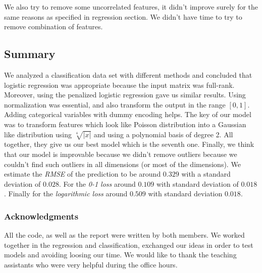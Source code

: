 \documentclass{article} %
\begin{document}
We also try to remove some uncorrelated features, it didn't improve surely for the same reasons as specified in regression section. We didn't have time to try to remove combination of features.

\subsection{Summary}

We analyzed a classification data set with different methods and concluded that logistic regression was appropriate because the input matrix was full-rank. Moreover, using the penalized logistic regression gave us similar results. Using normalization was essential, and also transform the output in the range $[0,1]$. Adding categorical variables with dummy encoding helps. The key of our model was to transform features which look like Poisson distribution into a Gaussian like distribution using $\sqrt[4]{|x|}$ and using a polynomial basis of degree 2. All together, they give us our best model which is the seventh one. Finally, we think that our model is improvable because we didn't remove outliers because we couldn't find such outliers in all dimensions (or most of the dimensions). We estimate the \textit{RMSE} of the prediction to be around $0.329$ with a standard deviation of $0.028$. For the \textit{0-1 loss} around $0.109$ with standard deviation of $0.018$. Finally for the \textit{logarithmic loss} around $0.509$ with standard deviation $0.018$.

\subsubsection*{Acknowledgments}
All the code, as well as the report were written by both members. We worked together in the regression and classification, exchanged our ideas in order to test models and avoiding loosing our time. We would like to thank the teaching assistants who were very helpful during the office hours.
\end{document}
